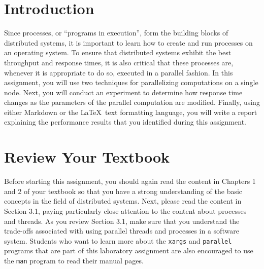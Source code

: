 


\usepackage[compact]{titlesec}



\section*{Introduction}

Since processes, or ``programs in execution'', form the building blocks of distributed systems, it is important to learn
how to create and run processes on an operating system. To ensure that distributed systems exhibit the best throughput
and response times, it is also critical that these processes are, whenever it is appropriate to do so, executed in a
parallel fashion. In this assignment, you will use two techniques for parallelizing computations on a single node. Next,
you will conduct an experiment to determine how response time changes as the parameters of the parallel computation are
modified.  Finally, using either Markdown or the \LaTeX~text formatting language, you will write a report explaining the
performance results that you identified during this assignment.

\section*{Review Your Textbook}

Before starting this assignment, you should again read the content in Chapters 1 and 2 of your textbook so that you have
a strong understanding of the basic concepts in the field of distributed systems. Next, please read the content in
Section 3.1, paying particularly close attention to the content about processes and threads. As you review Section 3.1,
make sure that you understand the trade-offs associated with using parallel threads and processes in a software system.
Students who want to learn more about the {\tt xargs} and {\tt parallel} programs that are part of this laboratory
assignment are also encouraged to use the {\tt man} program to read their manual pages.

\section*{}

